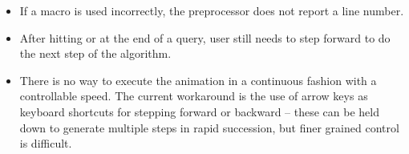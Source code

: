 \begin{itemize}
\item
  If a macro is used incorrectly,
  the preprocessor does not report a line number.

\item After hitting  or  at the end of a query,
  user still needs to step forward to do the next step of the algorithm.

\item
  There is no way to execute the animation in a continuous fashion with a
  controllable speed.
  The current workaround is the use of arrow keys as keyboard
  shortcuts for stepping forward or backward -- these can be held down to
  generate multiple steps in rapid succession, but finer grained control is
  difficult.

\end{itemize}

